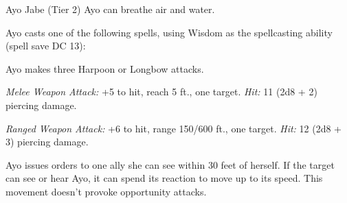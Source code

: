 \documentclass[10pt,a4paper,twoside,twocolumn,openany,nodeprecatedcode]{dndbook}
\begin{document}
\begin{DndMonster}[float=ht]{Ayo Jabe (Tier 2)}
\DndMonsterBasics[
armor-class = {15 (studded leather armor)},
hit-points = {\DndDice{15d8 + 30}},
speed = {30 ft., 30 ft. (key)}
]
\DndMonsterAbilityScores[
 str = 14,
 dex = 16,
 con = 14,
 int = 10,
 wis = 14,
 cha = 12
]
\DndMonsterDetails[
saving-throws = {Str +5, Dex +6},
skills = {Athletics +5, Perception +5, Survival +5},
damage-resistances = {acid},
languages = {Common, Goblin, Orc},
challenge = 5,
]
Ayo can breathe air and water.

Ayo casts one of the following spells, using Wisdom as the spellcasting ability (spell save DC 13):
\begin{DndMonsterSpells}
\end{DndMonsterSpells}
\par
{}
Ayo makes three Harpoon or Longbow attacks.

\textsl{Melee Weapon Attack:} +5 to hit, reach 5 ft., one target. \textsl{Hit:} 11 (2d8 + 2) piercing damage.

\textsl{Ranged Weapon Attack:} +6 to hit, range 150/600 ft., one target. \textsl{Hit:} 12 (2d8 + 3) piercing damage.

\par
{}
Ayo issues orders to one ally she can see within 30 feet of herself. If the target can see or hear Ayo, it can spend its reaction to move up to its speed. This movement doesn't provoke opportunity attacks.

\end{DndMonster}


\clearpage
{}
\end{document}
